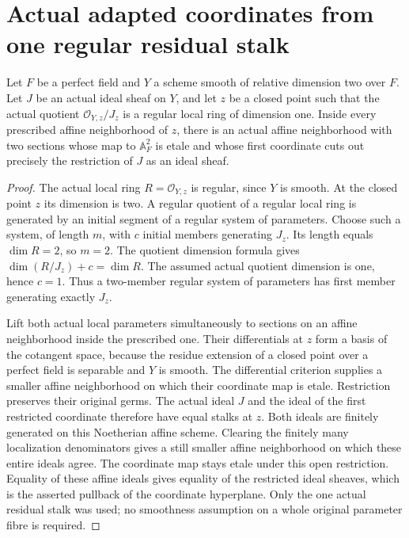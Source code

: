 \section{Actual adapted coordinates from one regular residual stalk}
\begin{theorem}\label{thm:pointwise-regular-divisor-etale-coordinates}
Let $F$ be a perfect field and $Y$ a scheme smooth of relative dimension two over $F$. Let $J$ be an actual ideal sheaf on $Y$, and let $z$ be a closed point such that the actual quotient $\mathcal O_{Y,z}/J_z$ is a regular local ring of dimension one. Inside every prescribed affine neighborhood of $z$, there is an actual affine neighborhood with two sections whose map to $\mathbb A_F^2$ is etale and whose first coordinate cuts out precisely the restriction of $J$ as an ideal sheaf.
\leanok
\end{theorem}
\begin{proof}
The actual local ring $R=\mathcal O_{Y,z}$ is regular, since $Y$ is smooth. At the closed point $z$ its dimension is two. A regular quotient of a regular local ring is generated by an initial segment of a regular system of parameters. Choose such a system, of length $m$, with $c$ initial members generating $J_z$. Its length equals $\dim R=2$, so $m=2$. The quotient dimension formula gives $\dim(R/J_z)+c=\dim R$. The assumed actual quotient dimension is one, hence $c=1$. Thus a two-member regular system of parameters has first member generating exactly $J_z$.

Lift both actual local parameters simultaneously to sections on an affine neighborhood inside the prescribed one. Their differentials at $z$ form a basis of the cotangent space, because the residue extension of a closed point over a perfect field is separable and $Y$ is smooth. The differential criterion supplies a smaller affine neighborhood on which their coordinate map is etale. Restriction preserves their original germs. The actual ideal $J$ and the ideal of the first restricted coordinate therefore have equal stalks at $z$. Both ideals are finitely generated on this Noetherian affine scheme. Clearing the finitely many localization denominators gives a still smaller affine neighborhood on which these entire ideals agree. The coordinate map stays etale under this open restriction. Equality of these affine ideals gives equality of the restricted ideal sheaves, which is the asserted pullback of the coordinate hyperplane. Only the one actual residual stalk was used; no smoothness assumption on a whole original parameter fibre is required.
\end{proof}
